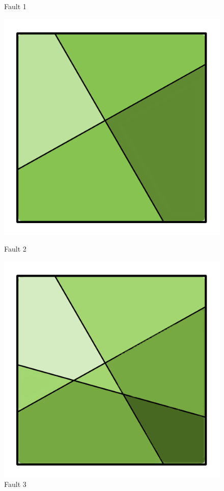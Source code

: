 \documentclass[11pt,a4paper,twoside,openright]{report}
\begin{document}
\begin{figure}[!htb]
  \caption{Fault 1}\label{fig:fault1}
\endminipage\hfill
{}
  \includegraphics[width=\linewidth]{fault4.png}
  \caption{Fault 2}\label{fig:fault2}
\endminipage\hfill
{}%
  \includegraphics[width=\linewidth]{fault6.png}
  \caption{Fault 3}\label{fig:fault3}
\endminipage
\end{figure}
\end{document}
